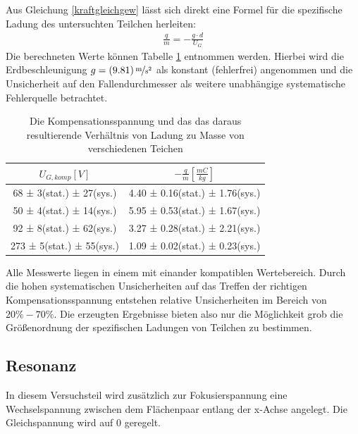 \documentclass[a4paper,12pt]{article}
\begin{document}
Aus Gleichung \ref{kraftgleichgew} lässt sich direkt eine Formel für die spezifische Ladung des untersuchten Teilchen herleiten:
\begin{align}\label{zspezm}
	\frac{q}{m} = -\frac{g \cdot  d}{U_{G}}
\end{align}
Die berechneten Werte können Tabelle \ref{tab:z-komp-result} entnommen werden. Hierbei wird die Erdbeschleunigung 
$g = \unitfrac[(9.81)]{m}{s^2}$ als konstant (fehlerfrei) angenommen und die Unsicherheit auf den Fallendurchmesser als weitere
unabhängige systematische Fehlerquelle betrachtet.


\begin{table}[h]
	\centering
	\begin{tabular}{ c | c }
		$U_{G,komp} [V] $ & $-\frac{q}{m}[\frac{mC}{kg}]$ \\
		\hline
		  68 ± 3(stat.) ± 27(sys.) &  4.40 ± 0.16(stat.) ± 1.76(sys.)  \\
		  50 ± 4(stat.) ± 14(sys.) &  5.95 ± 0.53(stat.) ± 1.67(sys.)  \\
		  92 ± 8(stat.) ± 62(sys.) &  3.27 ± 0.28(stat.) ± 2.21(sys.)  \\
		  273 ± 5(stat.) ± 55(sys.) & 1.09 ± 0.02(stat.) ± 0.23(sys.)  \\
	\end{tabular}
	\caption{Die Kompensationsspannung und das das daraus resultierende Verhältnis von Ladung zu Masse von verschiedenen Teichen}
	\label{tab:z-komp-result}
\end{table}


Alle Messwerte liegen in einem mit einander kompatiblen Wertebereich. Durch die hohen systematischen Unsicherheiten auf das
Treffen der richtigen Kompensationsspannung entstehen relative Unsicherheiten im Bereich von $20\% - 70 \%$. Die erzeugten
Ergebnisse bieten also nur die Möglichkeit grob die Größenordnung der spezifischen Ladungen von Teilchen zu bestimmen.

\subsection{Resonanz}
In diesem Versuchsteil wird zusätzlich zur Fokusierspannung eine Wechselspannung zwischen dem Flächenpaar entlang der x-Achse angelegt.
Die Gleichspannung wird auf $0$ geregelt.
\end{document}
